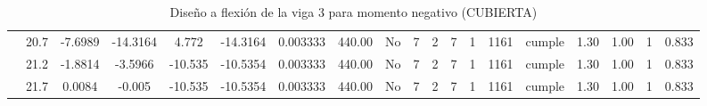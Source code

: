\begin{table}[H]
{\begin{tabular}{|c|c|c|c|c|c|r|c|c|c|c|c|c|c|c|c|c|c|c|}
\cline{2-19}    & 20.7 & -7.6989 & -14.3164 & 4.772 & -14.3164 & 0.003333 & 440.00 & No  & 7   & 2   & 7   & 1   & 1161 & \cellcolor[rgb]{ .776,  .937,  .808}cumple & 1.30 & 1.00 & 1   & 0.833 \bigstrut\\
\cline{2-19}    & 21.2 & -1.8814 & -3.5966 & -10.535 & -10.5354 & 0.003333 & 440.00 & No  & 7   & 2   & 7   & 1   & 1161 & \cellcolor[rgb]{ .776,  .937,  .808}cumple & 1.30 & 1.00 & 1   & 0.833 \bigstrut\\
\cline{2-19}    & 21.7 & 0.0084 & -0.005 & -10.535 & -10.5354 & 0.003333 & 440.00 & No  & 7   & 2   & 7   & 1   & 1161 & \cellcolor[rgb]{ .776,  .937,  .808}cumple & 1.30 & 1.00 & 1   & 0.833 \bigstrut\\
\hline
\end{tabular}%


  
 
  }
      \caption{Diseño a flexión de la viga 3 para momento negativo (CUBIERTA) }
  \label{tab:F VG3 CUB M-}%
\end{table}%
